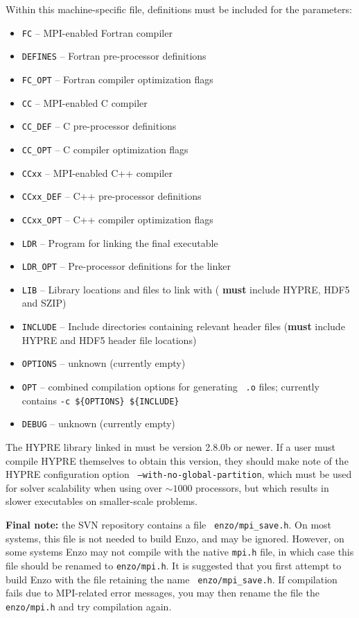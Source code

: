 \documentclass[letterpaper,10pt]{article}
\renewcommand{\(}{\left(}
\renewcommand{\)}{\right)}
\begin{document}
Within this machine-specific file, definitions must be included for
the parameters:
\begin{itemize}
\item {\tt FC} -- MPI-enabled Fortran compiler
\item {\tt DEFINES} -- Fortran pre-processor definitions
\item {\tt FC\_OPT} -- Fortran compiler optimization flags
\item {\tt CC} -- MPI-enabled C compiler
\item {\tt CC\_DEF} -- C pre-processor definitions
\item {\tt CC\_OPT} -- C compiler optimization flags
\item {\tt CCxx} -- MPI-enabled C++ compiler
\item {\tt CCxx\_DEF} -- C++ pre-processor definitions
\item {\tt CCxx\_OPT} -- C++ compiler optimization flags
\item {\tt LDR} -- Program for linking the final executable
\item {\tt LDR\_OPT} -- Pre-processor definitions for the linker
\item {\tt LIB} -- Library locations and files to link with ({\bf
  must} include HYPRE, HDF5 and SZIP)
\item {\tt INCLUDE} -- Include directories containing relevant header
  files ({\bf must} include HYPRE and HDF5 header file locations)
\item {\tt OPTIONS} -- unknown (currently empty)
\item {\tt OPT} -- combined compilation options for generating {\tt
  .o} files; currently contains {\tt -c \$\{OPTIONS\} \$\{INCLUDE\}}
\item {\tt DEBUG} -- unknown (currently empty)
\end{itemize}

The HYPRE library linked in must be version 2.8.0b or newer.  If a
user must compile HYPRE themselves to obtain this version, they should
make note of the HYPRE configuration option {\tt
--with-no-global-partition}, which must be used for solver scalability
when using over $\sim\!1000$ processors, but which results in slower
executables on smaller-scale problems. 

{\bf Final note:} the SVN repository contains a file {\tt
enzo/mpi\_save.h}.  On most systems, this file is not needed to build
Enzo, and may be ignored.  However, on some systems Enzo may not
compile with the native {\tt mpi.h} file, in which case this file
should be renamed to {\tt enzo/mpi.h}.  It is suggested that you first
attempt to build Enzo with the file retaining the name {\tt
enzo/mpi\_save.h}.  If compilation fails due to MPI-related error
messages, you may then rename the file the {\tt enzo/mpi.h} and try
compilation again.
 
\end{document}
